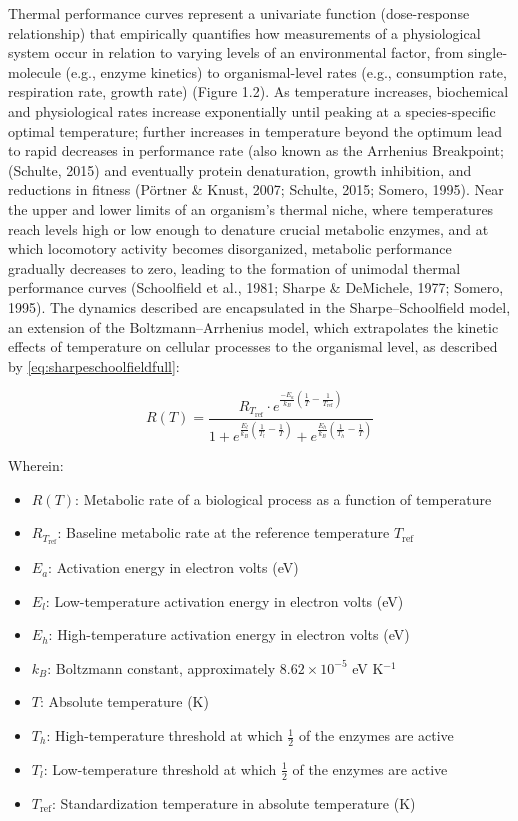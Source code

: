 \documentclass{CSUNthesis}
\begin{document}
Thermal performance curves represent a univariate function (dose-response relationship) that empirically quantifies how measurements of a physiological system occur in relation to varying levels of an environmental factor, from single-molecule (e.g., enzyme kinetics) to organismal-level rates (e.g., consumption rate, respiration rate, growth rate) (Figure 1.2). As temperature increases, biochemical and physiological rates increase exponentially until peaking at a species-specific optimal temperature; further increases in temperature beyond the optimum lead to rapid decreases in performance rate (also known as the Arrhenius Breakpoint; (Schulte, 2015) and eventually protein denaturation, growth inhibition, and reductions in fitness (Pörtner \& Knust, 2007; Schulte, 2015; Somero, 1995). Near the upper and lower limits of an organism's thermal niche, where temperatures reach levels high or low enough to denature crucial metabolic enzymes, and at which locomotory activity becomes disorganized, metabolic performance gradually decreases to zero, leading to the formation of unimodal thermal performance curves (Schoolfield et al., 1981; Sharpe \& DeMichele, 1977; Somero, 1995). The dynamics described are encapsulated in the Sharpe--Schoolfield model, an extension of the Boltzmann--Arrhenius model, which extrapolates the kinetic effects of temperature on cellular processes to the organismal level, as described by \eqref{eq:sharpeschoolfieldfull}:

\begin{equation}
\label{eq:sharpeschoolfieldfull}
R(T) = \frac{R_{T_{\text{ref}}} \cdot e^{\frac{-E_a}{k_B} \left( \frac{1}{T} - \frac{1}{T_{\text{ref}}} \right)}}
{1 + e^{\frac{E_l}{k_B} \left( \frac{1}{T_l} - \frac{1}{T} \right)} + e^{\frac{E_h}{k_B} \left( \frac{1}{T_h} - \frac{1}{T} \right)}}
\end{equation}

\noindent
Wherein:

\begin{itemize}
  \item $R(T)$: Metabolic rate of a biological process as a function of temperature
  \item $R_{T_{\text{ref}}}$: Baseline metabolic rate at the reference temperature $T_{\text{ref}}$
  \item $E_a$: Activation energy in electron volts (eV)
  \item $E_l$: Low-temperature activation energy in electron volts (eV)
  \item $E_h$: High-temperature activation energy in electron volts (eV)
  \item $k_B$: Boltzmann constant, approximately $8.62 \times 10^{-5}$ eV K$^{-1}$
  \item $T$: Absolute temperature (K)
  \item $T_h$: High-temperature threshold at which $\frac{1}{2}$ of the enzymes are active
  \item $T_l$: Low-temperature threshold at which $\frac{1}{2}$ of the enzymes are active
  \item $T_{\text{ref}}$: Standardization temperature in absolute temperature (K)
\end{itemize}
\end{document}
